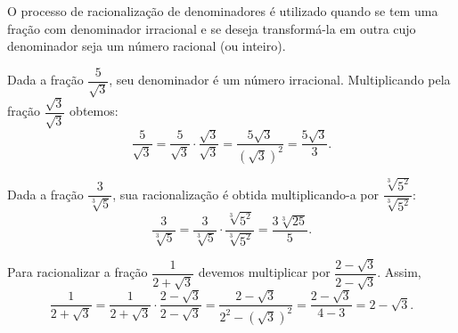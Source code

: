 O processo de racionalização de denominadores é utilizado quando se tem uma fração com denominador irracional e se deseja transformá-la em outra cujo denominador seja um número racional (ou inteiro).

\begin{exem}
    Dada a fração $\dfrac{5}{\sqrt{3}}$, seu denominador é um número irracional. Multiplicando pela fração $\dfrac{\sqrt{3}}{\sqrt{3}}$ obtemos:
    \begin{equation*}
        \dfrac{5}{\sqrt{3}} = \dfrac{5}{\sqrt{3}} \cdot \dfrac{\sqrt{3}}{\sqrt{3}} = \dfrac{5\sqrt{3}}{(\sqrt{3})^2} = \dfrac{5\sqrt{3}}{3}.
    \end{equation*}
\end{exem}

\begin{exem}
    Dada a fração $\dfrac{3}{\sqrt[3]{5}}$, sua racionalização é obtida multiplicando-a por $\dfrac{\sqrt[3]{5^2}}{\sqrt[3]{5^2}}$:
    \begin{equation*}
        \dfrac{3}{\sqrt[3]{5}} = \dfrac{3}{\sqrt[3]{5}}\cdot \dfrac{\sqrt[3]{5^2}}{\sqrt[3]{5^2}} = \dfrac{3\sqrt[3]{25}}{5}.
    \end{equation*}
\end{exem}

\begin{exem}
    Para racionalizar a fração $\dfrac{1}{2+\sqrt{3}}$ devemos multiplicar por $\dfrac{2-\sqrt{3}}{2-\sqrt{3}}$. Assim,
    \begin{equation*}
        \dfrac{1}{2+\sqrt{3}} = \dfrac{1}{2+\sqrt{3}}\cdot \dfrac{2-\sqrt{3}}{2-\sqrt{3}} = \dfrac{2-\sqrt{3}}{2^2-(\sqrt{3})^2} = \dfrac{2-\sqrt{3}}{4-3} = 2-\sqrt{3}. 
    \end{equation*}
\end{exem}


